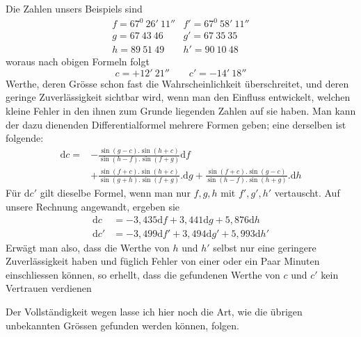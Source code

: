 \par\clearpage
{}
\noindent Die Zahlen unsers Beispiels sind
\[
\begin{array}{ll}
f=67^0\ 26'\ 11''&f'=67^0\ 58'\ 11''\\
g=67\ 43\ 46&g'=67\ 35\ 35\\
h=89\ 51\ 49&h'=90\ 10\ 48
\end{array}
\]
woraus nach obigen Formeln folgt
\[
c=+12'\ 21''\qquad c'=-14'\ 18''
\]
Werthe, deren Grösse schon fast die Wahrscheinlichkeit überschreitet, und deren geringe Zuverlässigkeit sichtbar wird, wenn man den Einfluss entwickelt, welchen kleine Fehler in den ihnen zum Grunde liegenden Zahlen auf sie haben. Man kann der dazu dienenden Differentialformel mehrere Formen geben; eine derselben ist folgende:
\[
\begin{aligned}
\mathrm{d}c={}&-\frac{\sin(g-c).\sin(h+c)}{\sin(h-f).\sin(f+g)}\mathrm{d}f\\
&+\frac{\sin(f+c).\sin(h+c)}{\sin(g+h).\sin(f+g)}.\mathrm{d}g
+\frac{\sin(f+c).\sin(g-c)}{\sin(h-f).\sin(h+g)}.\mathrm{d}h
\end{aligned}
\]
Für $\mathrm{d}c'$ gilt dieselbe Formel, wenn man nur $f,g,h$ mit $f',g',h'$ vertauscht. Auf unsere Rechnung angewandt, ergeben sie
\[
\begin{aligned}
\mathrm{d}c&=-3{,}435\mathrm{d}f+3{,}441\mathrm{d}g+5{,}876\mathrm{d}h\\
\mathrm{d}c'&=-3{,}499\mathrm{d}f'+3{,}494\mathrm{d}g'+5{,}993\mathrm{d}h'
\end{aligned}
\]
Erwägt man also, dass die Werthe von $h$ und $h'$ selbst nur eine geringere Zuverlässigkeit haben und füglich Fehler von einer oder ein Paar Minuten einschliessen können, so erhellt, dass die gefundenen Werthe von $c$ und $c'$ kein Vertrauen verdienen

Der Vollständigkeit wegen lasse ich hier noch die Art, wie die übrigen unbekannten Grössen gefunden werden können, folgen.

